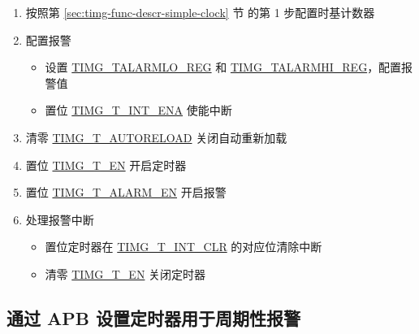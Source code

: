 \documentclass[main\_\_CN.tex]{subfiles}
\begin{document}
\begin{enumerate}
    \item 按照第 \ref{sec:timg-func-descr-simple-clock} 节 \textit{} 的第 1 步配置时基计数器
    \item 配置报警
    \begin{itemize}
        \item 设置 \hyperref[regdesc:TIMGTXALARMLOREG]{TIMG\_TALARMLO\_REG} 和 \hyperref[regdesc:TIMGTXALARMHIREG]{TIMG\_TALARMHI\_REG}，配置报警值
        \item 置位 \hyperref[fielddesc:TIMGTXINTENA]{TIMG\_T\_INT\_ENA} 使能中断
    \end{itemize}
    \item 清零 \hyperref[fielddesc:TIMGTXAUTORELOAD]{TIMG\_T\_AUTORELOAD} 关闭自动重新加载
    \item 置位 \hyperref[fielddesc:TIMGTXEN]{TIMG\_T\_EN} 开启定时器
    \item 置位 \hyperref[fielddesc:TIMGTXALARMEN]{TIMG\_T\_ALARM\_EN} 开启报警
    \item 处理报警中断
    \begin{itemize}
        \item 置位定时器在 \hyperref[fielddesc:TIMGTXINTCLR]{TIMG\_T\_INT\_CLR} 的对应位清除中断
        \item 清零 \hyperref[fielddesc:TIMGTXEN]{TIMG\_T\_EN} 关闭定时器
    \end{itemize}
\end{enumerate}

\subsection{通过 APB 设置定时器用于周期性报警}
\end{document}
